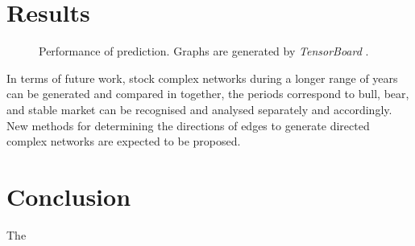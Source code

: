 \section{Results}
\begin{figure}
	\centering
	
	
	\caption{Performance of prediction. Graphs are generated by \textit{TensorBoard} \cite{tensorflow2015-whitepaper}.}
	\label{fig:prediction}
\end{figure}

In terms of future work, stock complex networks during a longer range of years can be generated and compared in together, the periods correspond to bull, bear, and stable market can be recognised and analysed separately and accordingly. New methods for determining the directions of edges to generate directed complex networks are expected to be proposed.

\section{Conclusion}
The 

